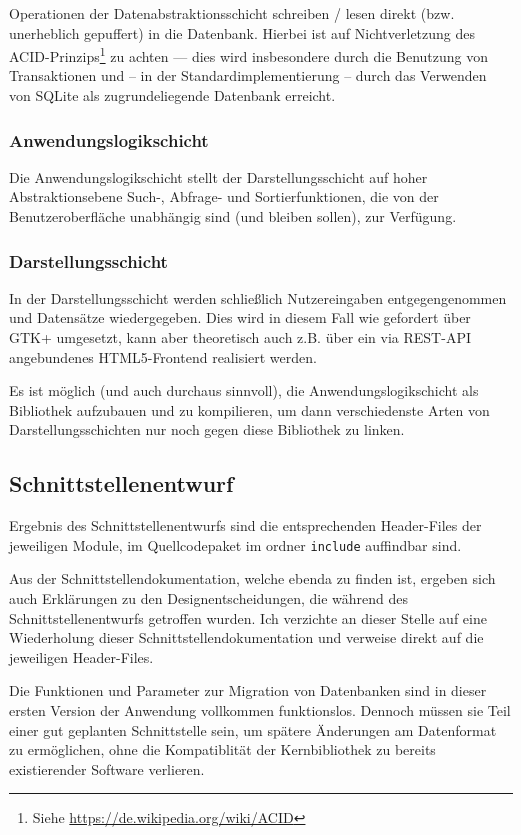 Operationen der Datenabstraktionsschicht schreiben / lesen direkt (bzw. unerheblich
gepuffert) in die Datenbank. Hierbei ist auf Nichtverletzung des ACID-Prinzips\footnote{Siehe
\url{https://de.wikipedia.org/wiki/ACID}} zu achten --- dies wird insbesondere durch die Benutzung
von Transaktionen und -- in der Standardimplementierung -- durch das Verwenden von SQLite als
zugrundeliegende Datenbank erreicht.

\subsubsection{Anwendungslogikschicht}
Die Anwendungslogikschicht stellt der Darstellungsschicht auf hoher Abstraktionsebene Such-, Abfrage-
und Sortierfunktionen, die von der Benutzeroberfläche unabhängig sind (und bleiben sollen), zur Verfügung.

\subsubsection{Darstellungsschicht}
In der Darstellungsschicht werden schließlich Nutzereingaben entgegengenommen und
Datensätze wiedergegeben. Dies wird in diesem Fall wie gefordert über GTK+ umgesetzt,
kann aber theoretisch auch z.B. über ein via REST-API angebundenes HTML5-Frontend
realisiert werden.

Es ist möglich (und auch durchaus sinnvoll), die Anwendungslogikschicht als Bibliothek
aufzubauen und zu kompilieren, um dann verschiedenste Arten von Darstellungsschichten
nur noch gegen diese Bibliothek zu linken.

\subsection{Schnittstellenentwurf}
Ergebnis des Schnittstellenentwurfs sind die entsprechenden Header-Files der jeweiligen Module,
im Quellcodepaket im ordner \lstinline{include} auffindbar sind.

Aus der Schnittstellendokumentation, welche ebenda zu finden ist, ergeben sich auch Erklärungen zu
den Designentscheidungen, die während des Schnittstellenentwurfs getroffen wurden.
Ich verzichte an dieser Stelle auf eine Wiederholung dieser Schnittstellendokumentation und verweise
direkt auf die jeweiligen Header-Files.

Die Funktionen und Parameter zur Migration von Datenbanken sind in dieser ersten Version der Anwendung
vollkommen funktionslos. Dennoch müssen sie Teil einer gut geplanten Schnittstelle sein, um spätere
Änderungen am Datenformat zu ermöglichen, ohne die Kompatiblität der Kernbibliothek zu bereits existierender
Software verlieren.

